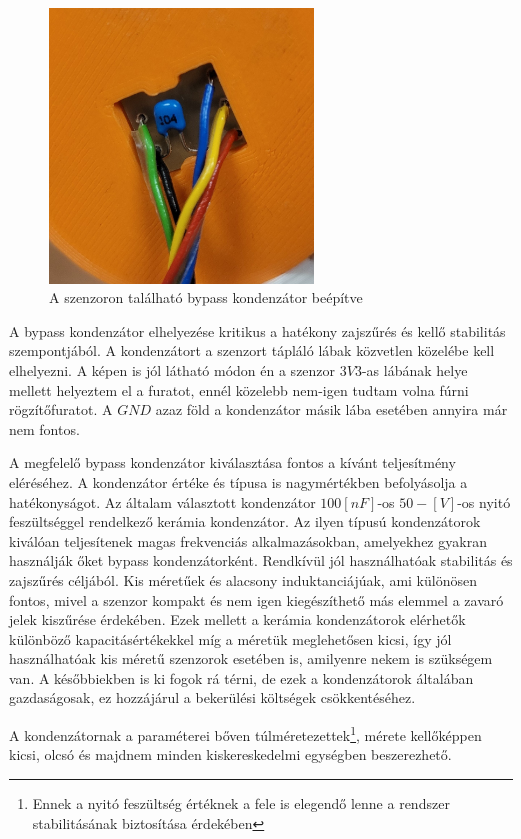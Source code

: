 \begin{figure}[!ht]
\centering
\includegraphics[width=70mm, keepaspectratio]{figures/Csuklo_szog_teszt/bypass}
\caption{A szenzoron található bypass kondenzátor beépítve}
\label{fig:bypass}
\end{figure}

A bypass kondenzátor elhelyezése kritikus a hatékony zajszűrés és kellő stabilitás szempontjából. A kondenzátort a szenzort tápláló lábak közvetlen közelébe kell elhelyezni. A képen is jól látható módon én a szenzor $3V3$-as lábának helye mellett helyeztem el a furatot, ennél közelebb nem-igen tudtam volna fúrni rögzítőfuratot. A $GND$ azaz föld a kondenzátor másik lába esetében annyira már nem fontos.

A megfelelő bypass kondenzátor kiválasztása fontos a kívánt teljesítmény eléréséhez. A kondenzátor értéke és típusa is nagymértékben befolyásolja a hatékonyságot. Az általam választott kondenzátor $100[nF]$-os $50-[V]$-os nyitó feszültséggel rendelkező kerámia kondenzátor. Az ilyen típusú kondenzátorok kiválóan teljesítenek magas frekvenciás alkalmazásokban, amelyekhez gyakran használják őket bypass kondenzátorként. Rendkívül jól használhatóak stabilitás és zajszűrés céljából. Kis méretűek és alacsony induktanciájúak, ami különösen fontos, mivel a szenzor kompakt és nem igen kiegészíthető más elemmel a zavaró jelek kiszűrése érdekében. Ezek mellett a kerámia kondenzátorok elérhetők különböző kapacitásértékekkel míg a méretük meglehetősen kicsi, így jól használhatóak kis méretű szenzorok esetében is, amilyenre nekem is szükségem van. A későbbiekben is ki fogok rá térni, de ezek a kondenzátorok általában gazdaságosak, ez hozzájárul a bekerülési költségek csökkentéséhez.

A kondenzátornak a paraméterei bőven túlméretezettek\footnote{Ennek a nyitó feszültség értéknek a fele is elegendő lenne a rendszer stabilitásának biztosítása érdekében}, mérete kellőképpen kicsi, olcsó és majdnem minden kiskereskedelmi egységben beszerezhető.

